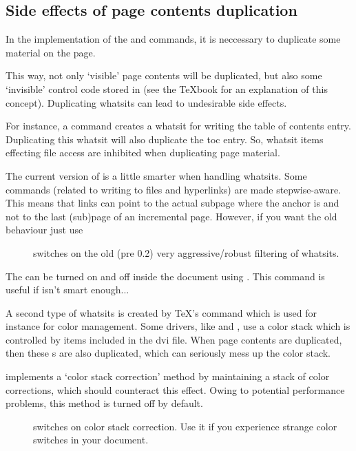 \documentclass[12pt]{scrartcl}
\let\newslide=\relax
\begin{document}
\newslide

\subsection{Side effects of page contents duplication}\label{Sec:Dupl}
In the implementation of the  and  commands, it is neccessary to duplicate some
material on the page.

This way, not only `visible' page contents will be duplicated, but also some `invisible' control code stored in
 (see the \TeX book for an explanation of this concept). Duplicating whatsits can lead to undesirable
side effects.

For instance, a  command creates a whatsit for writing the table of contents entry. Duplicating this
whatsit will also duplicate the toc entry. So, whatsit items effecting file access are inhibited when duplicating page
material.

\newslide

The current version of  is a little smarter when handling whatsits. Some commands (related to writing to
files and hyperlinks) are made stepwise-aware. This means that links can point to the actual subpage where the
anchor is and not to the last (sub)page of an incremental page. However, if you want the old behaviour just use
\begin{description}
\item[] switches on the old
  (pre 0.2) very aggressive/robust filtering of whatsits.
\end{description}
The  can be turned on and off inside the document using . This command is
useful if  isn't smart enough...

\newslide

A second type of whatsits is created by \TeX's  command which is used for instance for color
management. Some drivers, like  and , use a color stack which is controlled by
 items included in the dvi file. When page contents are duplicated, then these s
are also duplicated, which can seriously mess up the color stack.

\newslide

 implements a `color stack correction' method by maintaining a stack of color corrections, which should
counteract this effect. Owing to potential performance problems, this method is turned off by default.
\begin{description}
\item[] switches on color stack correction. Use it if you experience strange color
  switches in your document.
\end{description}
\end{document}

